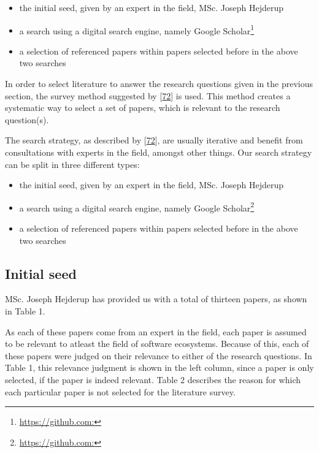 \documentclass[]{book}
\providecommand{\tightlist}{%
  \setlength{\itemsep}{0pt}\setlength{\parskip}{0pt}}
\let\rmarkdownfootnote\footnote%
\def\footnote{\protect\rmarkdownfootnote}
\begin{document}
\begin{itemize}
\tightlist
\item
  the initial seed, given by an expert in the field, MSc. Joseph
  Hejderup
\item
  a search using a digital search engine, namely Google
  Scholar\footnote{\url{https://github.com:}}
\item
  a selection of referenced papers within papers selected before in the
  above two searches
\end{itemize}

In order to select literature to answer the research questions given in
the previous section, the survey method suggested by
{[}\protect\hyperlink{ref-Kitchenham2004}{72}{]} is used. This method
creates a systematic way to select a set of papers, which is relevant to
the research question(s).

The search strategy, as described by
{[}\protect\hyperlink{ref-Kitchenham2004}{72}{]}, are usually iterative
and benefit from consultations with experts in the field, amongst other
things. Our search strategy can be split in three different types:

\begin{itemize}
\tightlist
\item
  the initial seed, given by an expert in the field, MSc. Joseph
  Hejderup
\item
  a search using a digital search engine, namely Google
  Scholar\footnote{\url{https://github.com:}}
\item
  a selection of referenced papers within papers selected before in the
  above two searches
\end{itemize}

\subsection{Initial seed}\label{initial-seed}

MSc. Joseph Hejderup has provided us with a total of thirteen papers, as
shown in Table 1.

As each of these papers come from an expert in the field, each paper is
assumed to be relevant to atleast the field of software ecosystems.
Because of this, each of these papers were judged on their relevance to
either of the research questions. In Table 1, this relevance judgment is
shown in the left column, since a paper is only selected, if the paper
is indeed relevant. Table 2 describes the reason for which each
particular paper is not selected for the literature survey.
\end{document}
